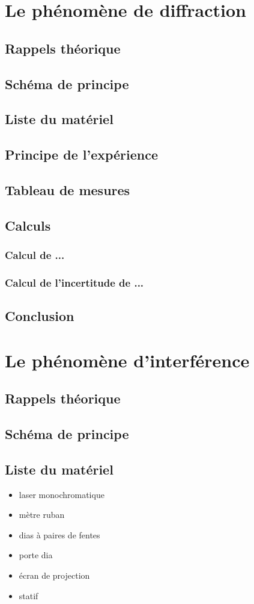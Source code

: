 \documentclass[11pt,a4paper]{report}
\begin{document}
\tableofcontents
\chapter{Le phénomène de diffraction}
	\section{Rappels théorique}
	\section{Schéma de principe}
	\section{Liste du matériel}
	
	\section{Principe de l'expérience}
	\section{Tableau de mesures}
	\section{Calculs}
		\subsection{Calcul de ...}
		\subsection{Calcul de l'incertitude de ...}
	\section{Conclusion}
\chapter{Le phénomène d'interférence}
	\section{Rappels théorique}
	\section{Schéma de principe}
	\section{Liste du matériel}
	\begin{itemize}
	\item laser monochromatique
	\item mètre ruban
	\item dias à paires de fentes
	\item porte dia
	\item écran de projection
	\item statif
	\end{itemize}
\end{document}

